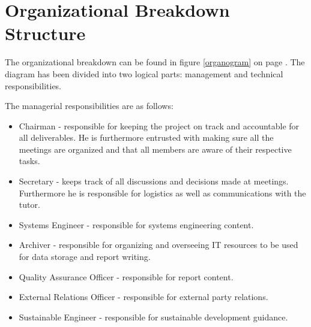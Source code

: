 \section{Organizational Breakdown Structure}
\label{dsePPOBS}
The organizational breakdown can be found in figure \ref{organogram} on page \pageref{organogram}. The diagram has been divided into two logical parts: management and technical responsibilities.

The managerial responsibilities are as follows:
\begin{itemize}
	\item Chairman - responsible for keeping the project on track and accountable for all deliverables. He is furthermore entrusted with making sure all the meetings are organized and that all members are aware of their respective tasks.
	\item Secretary - keeps track of all discussions and decisions made at meetings. Furthermore he is responsible for logistics as well as communications with the tutor.
	\item Systems Engineer - responsible for systems engineering content.
	\item Archiver - responsible for organizing and overseeing IT resources to be used for data storage and report writing.
	\item Quality Assurance Officer - responsible for report content.
	\item External Relations Officer - responsible for external party relations.
	\item Sustainable Engineer - responsible for sustainable development guidance. 
\end{itemize}

